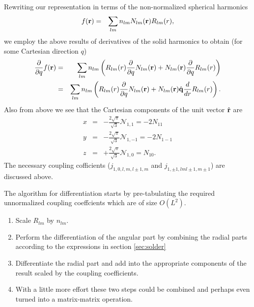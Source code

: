 \documentclass[12pt]{article}
\newcommand{\N}{\mathcal{N}}
\newcommand{\rv}{\vb{r}}
\newcommand{\rhat}{\hat{\rv}}
\begin{document}
Rewriting our representation in terms of the non-normalized spherical harmonics
\begin{eqnarray}
  f(\rv) & = & \sum_{l m} n_{lm} N_{lm}(\rv) R_{lm}(r) ,
\end{eqnarray}
we employ the above results of derivatives of the solid harmonics to obtain (for some Cartesian direction $q$)
\begin{eqnarray}
  \frac{\partial}{\partial q} f(\rv) & = & \sum_{l m} n_{lm} \left(R_{lm}(r) \frac{\partial}{\partial q} N_{lm}(\rv)  + N_{lm}(\rv)  \frac{\partial}{\partial q} R_{lm}(r) \right) \\
   & = & \sum_{l m} n_{lm} \left( R_{lm}(r) \frac{\partial}{\partial q} N_{lm}(\rv)  + N_{lm}(\rv) \hat{\vb{q}} \frac{d}{dr} R_{lm}(r) \right).
\end{eqnarray}
Also from above we see that the Cartesian components of the unit vector $\rhat$ are
\begin{eqnarray}
  x & = & - \frac{2 \sqrt{\pi}}{\sqrt{3}} \N_{1,1} = -2 N_{11}\\
  y & = & - \frac{2 \sqrt{\pi}}{\sqrt{3}} \N_{1,-1}= -2 N_{1-1} \\
  z & = & + \frac{2 \sqrt{\pi}}{\sqrt{3}} \N_{1,0} = N_{10}.
\end{eqnarray}
The necessary coupling cofficients ($j_{1, 0, l, m, l\pm 1, m}$ and $j_{1, \pm 1, l m l\pm 1, m\pm 1}$) are discussed above.

The algorithm for differentiation starts by pre-tabulating the required unnormalized coupling coeffcients which are of size $O(L^2)$.
\begin{enumerate}
\item Scale $R_{lm}$ by $n_{lm}$. 
\item Perform the differentiation of the angular part by combining the radial parts according to the expressions in section \ref{sec:solder}
\item Differentiate the radial part and add into the appropriate components of the result scaled by the coupling coefficients.
\item With a little more effort these two steps could be combined and perhaps even turned into a matrix-matrix operation.
\end{enumerate}
  
\end{document}

